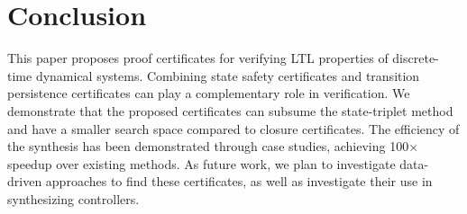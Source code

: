 \documentclass[acmlarge]{acmart}
\begin{document}

\section{Conclusion}
This paper proposes proof certificates for verifying LTL properties of discrete-time dynamical systems.
Combining state safety certificates and transition persistence certificates can play a complementary role in verification. We demonstrate that the proposed certificates can subsume the state-triplet method and have a smaller search space compared to closure certificates. The efficiency of the synthesis has been demonstrated through case studies, achieving 100× speedup over existing methods.
As future work, we plan to investigate data-driven approaches to find these certificates, as well as investigate their use in synthesizing controllers.




\appendix
\end{document}
